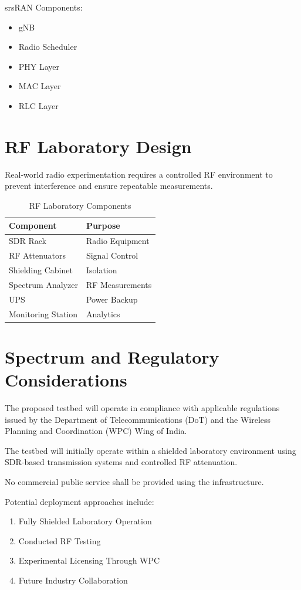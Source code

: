\documentclass[12pt,a4paper]{article}
\begin{document}
srsRAN Components:

\begin{itemize}
	\item gNB
	\item Radio Scheduler
	\item PHY Layer
	\item MAC Layer
	\item RLC Layer
\end{itemize}

\section{RF Laboratory Design}
Real-world radio experimentation requires a controlled RF environment to prevent interference and ensure repeatable measurements.
\begin{table}[h]
	\centering
	\caption{RF Laboratory Components}
	\begin{tabular}{|l|l|}
		\hline
		Component & Purpose \\
		\hline
		SDR Rack & Radio Equipment \\
		RF Attenuators & Signal Control \\
		Shielding Cabinet & Isolation \\
		Spectrum Analyzer & RF Measurements \\
		UPS & Power Backup \\
		Monitoring Station & Analytics \\
		\hline
	\end{tabular}
\end{table}

\section{Spectrum and Regulatory Considerations}
The proposed testbed will operate in compliance with applicable regulations issued by the Department of Telecommunications (DoT) and the Wireless Planning and Coordination (WPC) Wing of India.

The testbed will initially operate within a shielded laboratory environment using SDR-based transmission systems and controlled RF attenuation.

No commercial public service shall be provided using the infrastructure.

Potential deployment approaches include:

\begin{enumerate}
	\item Fully Shielded Laboratory Operation
	\item Conducted RF Testing
	\item Experimental Licensing Through WPC
	\item Future Industry Collaboration
\end{enumerate}
\end{document}

